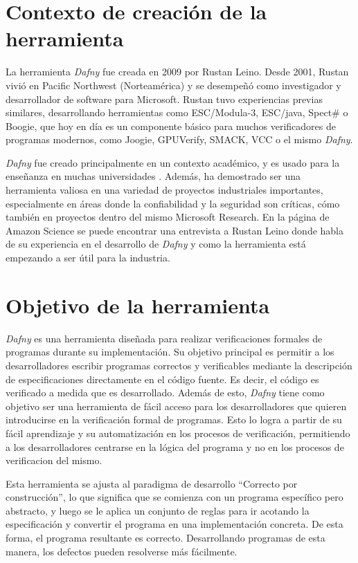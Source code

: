 \documentclass[runningheads]{llncs}
\begin{document}
\section{Contexto de creación de la herramienta}

La herramienta \textit{Dafny} fue creada en 2009 por Rustan Leino.
Desde 2001, Rustan vivió en Pacific Northwest (Norteamérica) y se desempeñó como investigador y desarrollador de software para Microsoft.
Rustan tuvo experiencias previas similares, desarrollando herramientas como ESC/Modula-3, ESC/java, Spect\# o Boogie,
que hoy en día es un componente básico para muchos verificadores de programas modernos,
como Joogie, GPUVerify, SMACK, VCC o el mismo \textit{Dafny}.


\textit{Dafny} fue creado principalmente en un contexto académico, 
y es usado para la enseñanza en muchas universidades \cite{DafnyALanguage}.
Además, ha demostrado ser una herramienta valiosa en una variedad de proyectos industriales importantes, 
especialmente en áreas donde la confiabilidad y la seguridad son críticas, 
cómo también en proyectos dentro del mismo Microsoft Research.
En la página de Amazon Science \cite{EntrevistaLeino} se puede encontrar una entrevista a Rustan Leino donde habla de su experiencia en el desarrollo de \textit{Dafny} y 
como la herramienta está empezando a ser útil para la industria.

\section{Objetivo de la herramienta}

\textit{Dafny} es una herramienta diseñada para realizar verificaciones formales de programas durante su implementación.
Su objetivo principal es permitir a los desarrolladores escribir programas correctos y verificables mediante la descripción
de especificaciones directamente en el código fuente. Es decir, el código es verificado a medida que es desarrollado.
Además de esto, \textit{Dafny} tiene como objetivo ser una herramienta de fácil acceso para los desarrolladores que quieren introducirse en la verificación formal de programas.
Esto lo logra a partir de su fácil aprendizaje y su automatización en los procesos de verificación, permitiendo a los desarrolladores centrarse en la lógica del programa y no en los procesos de verificacion del mismo.

Esta herramienta se ajusta al paradigma de desarrollo ``Correcto por construcción'', lo que significa que se comienza
con un programa específico pero abstracto, y luego se le aplica un conjunto de reglas para ir acotando la especificación
y convertir el programa en una implementación concreta. De esta forma, el programa resultante es correcto.
Desarrollando programas de esta manera, los defectos pueden resolverse más fácilmente.
\end{document}
